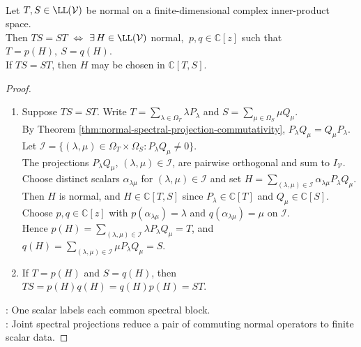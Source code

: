 \begin{corollary} \label{cor:commuting-normal-pair-generated-by-one-normal-operator} \\
Let $T,S\in\LL(\mathcal{V})$ be normal on a finite-dimensional complex inner-product space.\\
Then $TS=ST$ $\Longleftrightarrow$ $\exists\, H\in\LL(\mathcal{V})$ normal, $\ p,q\in\mathbb{C}[z]$ such that $T=p(H),\ S=q(H)$.\\
If $TS=ST$, then $H$ may be chosen in $\mathbb{C}[T,S]$.
\begin{proof}
\begin{enumerate}[label=\roman*.]
\setlength{\itemsep}{0pt}
\item[$(\Rightarrow)$] Suppose $TS=ST$. Write $T=\sum\limits_{\lambda\in\Omega_T}\lambda P_{\lambda}$ and $S=\sum\limits_{\mu\in\Omega_S}\mu Q_{\mu}$.\\
By Theorem \ref{thm:normal-spectral-projection-commutativity}, $P_{\lambda}Q_{\mu}=Q_{\mu}P_{\lambda}$. Let $\mathcal{I}=\{(\lambda,\mu)\in\Omega_T\times\Omega_S:P_{\lambda}Q_{\mu}\neq0\}$.\\
The projections $P_{\lambda}Q_{\mu}$, $(\lambda,\mu)\in\mathcal{I}$, are pairwise orthogonal and sum to $I_{\mathcal{V}}$.\\
Choose distinct scalars $\alpha_{\lambda\mu}$ for $(\lambda,\mu)\in\mathcal{I}$ and set $H=\sum\limits_{(\lambda,\mu)\in\mathcal{I}}\alpha_{\lambda\mu}P_{\lambda}Q_{\mu}$.\\
Then $H$ is normal, and $H\in\mathbb{C}[T,S]$ since $P_{\lambda}\in\mathbb{C}[T]$ and $Q_{\mu}\in\mathbb{C}[S]$.\\
Choose $p,q\in\mathbb{C}[z]$ with $p(\alpha_{\lambda\mu})=\lambda$ and $q(\alpha_{\lambda\mu})=\mu$ on $\mathcal{I}$.\\
Hence $p(H)=\sum\limits_{(\lambda,\mu)\in\mathcal{I}}\lambda P_{\lambda}Q_{\mu}=T$, and $q(H)=\sum\limits_{(\lambda,\mu)\in\mathcal{I}}\mu P_{\lambda}Q_{\mu}=S$.
\item[$(\Leftarrow)$] If $T=p(H)$ and $S=q(H)$, then $TS=p(H)q(H)=q(H)p(H)=ST$.
\end{enumerate}
: One scalar labels each common spectral block.\\
: Joint spectral projections reduce a pair of commuting normal operators to finite scalar data.
\end{proof}
\end{corollary}

